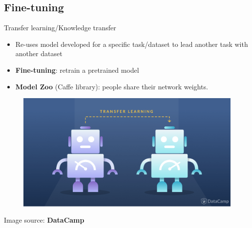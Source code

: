 \documentclass[10pt,svgnames]{beamer}
\begin{document}
\subsection{Fine-tuning}
\begin{frame}{Transfer learning/Knowledge transfer}{}
	\begin{itemize}
		\item Re-uses model developed for a specific task/dataset to lead another task with another dataset
		\item \textbf{Fine-tuning}: retrain a pretrained model
		\item \textbf{Model Zoo} (Caffe library): people share their network weights.
	\end{itemize}				
	\begin{center}
     \begin{figure}[htbp]
        \includegraphics[scale=.2]{images/transfer_learning_2x}\\[-1ex]     	
	\end{figure}
  \end{center}
  {\tiny Image source: \textbf{DataCamp}}
\end{frame}
\end{document}
